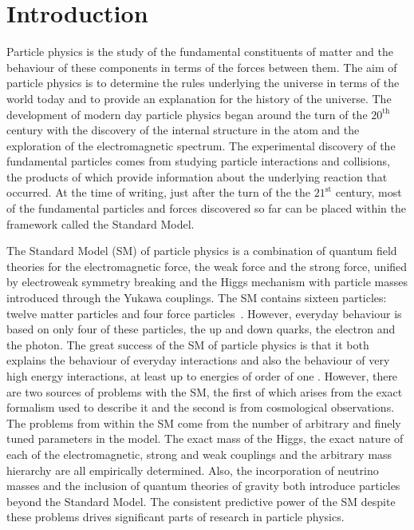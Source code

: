 \chapter{Introduction}

Particle physics is the study of the fundamental constituents of matter and 
the behaviour of these components in terms of the forces between them.
The aim of particle physics is to determine the rules underlying the universe in terms of the world today 
and to provide an explanation for the history of the universe.
The development of modern day particle physics began around the turn of the $20^{\text{th}}$ century with 
the discovery of the internal structure in the atom and the exploration of the electromagnetic spectrum.
The experimental discovery of the fundamental particles comes from studying particle interactions and collisions, 
the products of which provide information about the underlying reaction that occurred.
At the time of writing, just after the turn of the the $21^{\text{st}}$ century,
most of the fundamental particles and forces discovered so far can be placed within the framework called the Standard Model.

The Standard Model (SM) of particle physics is a combination of quantum field theories for the electromagnetic force, the weak force and
 the strong force, unified by electroweak symmetry breaking and the Higgs mechanism with particle masses introduced through the Yukawa couplings.
The SM contains sixteen particles: twelve matter particles and four force particles~\cite{PDG2012}.
However, everyday behaviour is based on only four of these particles, the up and down quarks, the electron and the photon.
The great success of the SM of particle physics is that it both explains the behaviour of 
everyday interactions and also the behaviour of very high energy interactions, at least up to energies of order of one \tev.
However, there are two sources of problems with the SM, the first of which arises 
from the exact formalism used to describe it and the second is from cosmological 
observations. 
The problems from within the SM come from the number of arbitrary and finely tuned parameters in the model.
The exact mass of the Higgs, the exact nature of each of the electromagnetic, strong and weak couplings 
and the arbitrary mass hierarchy are all empirically determined.
Also, the incorporation of neutrino masses and the inclusion of quantum theories of gravity both introduce particles beyond the 
Standard Model.
The consistent predictive power of the SM despite these problems drives significant parts of research in particle physics.

